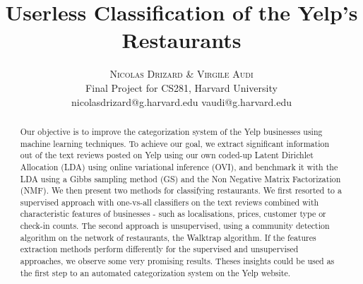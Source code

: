 \documentclass[twoside]{article}
\title{\vspace{-15mm}\fontsize{24pt}{10pt}\selectfont\textbf{Userless Classification of the Yelp's Restaurants}} %
\author{
\large
\textsc{Nicolas Drizard \& Virgile Audi}\\[2mm] %
\normalsize Final Project for CS281, Harvard University \\ %
\normalsize {nicolasdrizard@g.harvard.edu \quad vaudi@g.harvard.edu} %
\vspace{-5mm}
}
\date{}
\begin{document}
\maketitle %

\thispagestyle{fancy} %


\begin{abstract}

\noindent

Our objective is to improve the categorization system of the Yelp businesses using machine learning techniques. To achieve our goal, we extract significant information out of the text reviews posted on Yelp using our own coded-up Latent Dirichlet Allocation (LDA) using online variational inference (OVI), and benchmark it with the LDA using a Gibbs sampling method (GS) and the Non Negative Matrix Factorization (NMF). We then present two methods for classifying restaurants. We first resorted to a supervised approach with one-vs-all classifiers on the text reviews combined with characteristic features of businesses - such as localisations, prices, customer type or check-in counts. The second approach is unsupervised, using a community detection algorithm on the network of restaurants, the Walktrap algorithm. If the features extraction methods perform differently for the supervised and unsupervised approaches, we observe some very promising results. Theses insights could be used as the first step to an automated categorization system on the Yelp website. 

\end{abstract}

\end{document}
